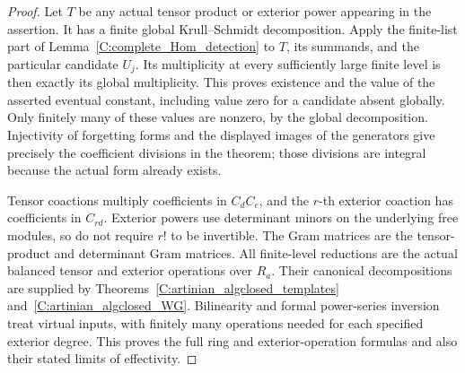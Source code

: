 \begin{proof}
Let $T$ be any actual tensor product or exterior power
appearing in the assertion.  It has a finite global
Krull--Schmidt decomposition.  Apply the finite-list part
of Lemma~\ref{C:complete_Hom_detection} to $T$, its
summands, and the particular candidate $U_j$.  Its
multiplicity at every sufficiently large finite level
is then exactly its global multiplicity.  This proves
existence and the value of the asserted eventual constant,
including value zero for a candidate absent globally.
Only finitely many of these values are nonzero, by the
global decomposition.  Injectivity of forgetting forms
and the displayed images of the generators give precisely
the coefficient divisions in the theorem; those divisions
are integral because the actual form already exists.

Tensor coactions multiply coefficients in $C_dC_e$, and
the $r$-th exterior coaction has coefficients in $C_{rd}$.
Exterior powers use determinant minors on the underlying
free modules, so do not require $r!$ to be invertible.
The Gram matrices are the tensor-product and determinant
Gram matrices.  All finite-level reductions are the actual
balanced tensor and exterior operations over $R_a$.
Their canonical decompositions are supplied by
Theorems~\ref{C:artinian_algclosed_templates}
and~\ref{C:artinian_algclosed_WG}.  Bilinearity and formal
power-series inversion treat virtual inputs, with finitely
many operations needed for each specified exterior degree.
This proves the full ring and exterior-operation formulas
and also their stated limits of effectivity.
\end{proof}

